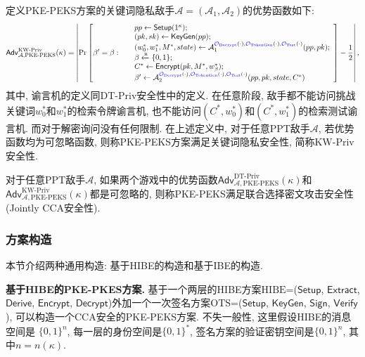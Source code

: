 \begin{definition}[KW-Priv安全性]
定义PKE-PEKS方案的关键词隐私敌手$\mathcal{A} = (\mathcal{A}_1, \mathcal{A}_2)$的优势函数如下:
\begin{displaymath}
\mathsf{Adv}_{\mathcal{A}, \text{PKE-PEKS}}^{\text{KW-Priv}}(\kappa) = \left| \Pr \left[\beta' = \beta:~
\begin{array}{ll}
	& pp \leftarrow \mathsf{Setup}(1^\kappa); \\		
	& (pk, sk) \leftarrow \mathsf{KeyGen}(pp);\\
	& (w_0^*, w_1^*, M^*, state) \leftarrow \mathcal{A}_1^{{\color{blue} \mathcal{O}_{\text{Decrypt}}}(\cdot), {\color{blue} \mathcal{O}_{\text{TokenGen}}}(\cdot), {\color{blue} \mathcal{O}_{\text{Test}}}(\cdot)}(pp, pk); \\
	& \beta \xleftarrow{\textup{\tiny R}} \{0, 1\}; \\
	& C^* \leftarrow \mathsf{Encrypt}(pk, M^*, w_\beta^*); \\
	& \beta' \leftarrow \mathcal{A}_2^{{\color{blue} \mathcal{O}_{\text{Decrypt}}}(\cdot), {\color{blue} \mathcal{O}_{\text{TokenGen}}}(\cdot), {\color{blue} \mathcal{O}_{\text{Test}}}(\cdot)}(pp, pk, state, C^*)
	\end{array} 
\right] - \frac{1}{2} \right|,
\end{displaymath}
其中, 谕言机的定义同DT-Priv安全性中的定义. 在任意阶段, 敌手都不能访问挑战关键词$w_0^*$和$w_1^*$的检索令牌谕言机, 也不能访问$(C^*, w_0^*)$和$(C^*, w_1^*)$的检索测试谕言机. 而对于解密询问没有任何限制. 在上述定义中, 对于任意PPT敌手$\mathcal{A}$, 若优势函数均为可忽略函数, 则称PKE-PEKS方案满足关键词隐私安全性, 简称KW-Priv安全性.
\end{definition}

\begin{definition}
对于任意PPT敌手$\mathcal{A}$, 如果两个游戏中的优势函数$\mathsf{Adv}_{\mathcal{A}, \text{PKE-PEKS}}^{\text{DT-Priv}}(\kappa)$和$\mathsf{Adv}_{\mathcal{A}, \text{PKE-PEKS}}^{\text{KW-Priv}}(\kappa)$都是可忽略的, 则称PKE-PEKS满足联合选择密文攻击安全性(Jointly CCA安全性).
\end{definition}

\subsubsection{方案构造}
本节介绍两种通用构造: 基于HIBE的构造和基于IBE的构造.

\medskip\noindent\textbf{基于HIBE的PKE-PKES方案.} 基于一个两层的HIBE方案$\text{HIBE}$=($\mathsf{Setup}$, $\mathsf{Extract}$, $\mathsf{Derive}$, $\mathsf{Encrypt}$, $\mathsf{Decrypt}$)外加一个一次签名方案$\text{OTS}$=($\mathsf{Setup}$, $\mathsf{KeyGen}$, $\mathsf{Sign}$, $\mathsf{Verify}$), 可以构造一个CCA安全的PKE-PEKS方案. 不失一般性, 这里假设HIBE的消息空间是 $\{0,1\}^n$, 每一层的身份空间是$\{0,1\}^*$, 签名方案的验证密钥空间是$\{0,1\}^n$, 其中$n = n(\kappa)$.
 

